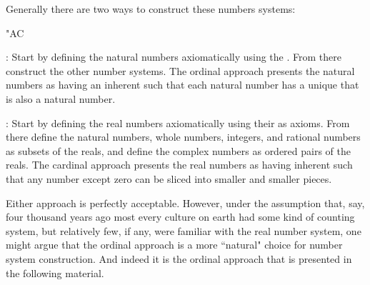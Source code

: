 Generally there are two ways to construct these numbers systems:%
\begin{dingautolist}{"AC}
  \item {}:
      Start by defining the natural numbers axiomatically using the .
      From there construct the other number systems.
      The ordinal approach presents the natural numbers as having an inherent 
      such that each natural number has a unique 
      that is also a natural number.

  \item {}:
      Start by defining the real numbers axiomatically using their 
      as axioms.
      From there define the natural numbers, whole numbers, integers, and rational numbers
      as subsets of the reals,
      and define the complex numbers as ordered pairs of the reals.
      The cardinal approach presents the real numbers as having inherent 
      such that any number except zero can be sliced into smaller and smaller pieces.
\end{dingautolist}

Either approach is perfectly acceptable.
%
However, under the assumption that, say, four thousand years ago
most every culture on earth had some kind of counting system,
but relatively few, if any, were familiar with the real number system,
one might argue that the ordinal approach
is a more ``natural" choice for number system construction.
And indeed it is the ordinal approach that is presented in the following material.

